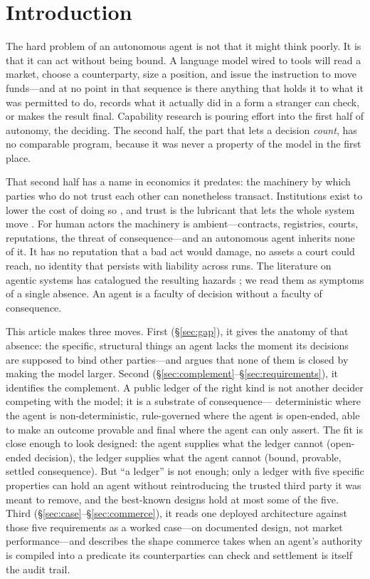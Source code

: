 \documentclass[11pt]{article}
\begin{document}
\section{Introduction}
\label{sec:intro}

The hard problem of an autonomous agent is not that it might think
poorly. It is that it can act without being bound. A language model wired
to tools will read a market, choose a counterparty, size a position, and
issue the instruction to move funds---and at no point in that sequence is
there anything that holds it to what it was permitted to do, records what
it actually did in a form a stranger can check, or makes the result
final. Capability research is pouring effort into the first half of
autonomy, the deciding. The second half, the part that lets a decision
\emph{count}, has no comparable program, because it was never a property
of the model in the first place.

That second half has a name in economics it predates: the machinery by
which parties who do not trust each other can nonetheless transact.
Institutions exist to lower the cost of doing so
\citep{north1990institutions}, and trust is the lubricant that lets the
whole system move \citep{arrow1974limits}. For human actors the machinery
is ambient---contracts, registries, courts, reputations, the threat of
consequence---and an autonomous agent inherits none of it. It has no
reputation that a bad act would damage, no assets a court could reach, no
identity that persists with liability across runs. The literature on
agentic systems has catalogued the resulting hazards
\citep{park2023generative,chan2023harms}; we read them as symptoms of a
single absence. An agent is a faculty of decision without a faculty of
consequence.

This article makes three moves. First (\S\ref{sec:gap}), it gives the
anatomy of that absence: the specific, structural things an agent lacks
the moment its decisions are supposed to bind other parties---and argues
that none of them is closed by making the model larger. Second
(\S\ref{sec:complement}--\S\ref{sec:requirements}), it identifies the
complement. A public ledger of the right kind is not another decider
competing with the model; it is a substrate of consequence---
deterministic where the agent is non-deterministic, rule-governed where
the agent is open-ended, able to make an outcome provable and final where
the agent can only assert. The fit is close enough to look designed: the
agent supplies what the ledger cannot (open-ended decision), the ledger
supplies what the agent cannot (bound, provable, settled consequence).
But ``a ledger'' is not enough; only a ledger with five specific
properties can hold an agent without reintroducing the trusted third
party it was meant to remove, and the best-known designs hold at most
some of the five. Third (\S\ref{sec:case}--\S\ref{sec:commerce}), it
reads one deployed architecture against those five requirements as a
worked case---on documented design, not market performance---and
describes the shape commerce takes when an agent's authority is compiled
into a predicate its counterparties can check and settlement is itself
the audit trail.
\end{document}
